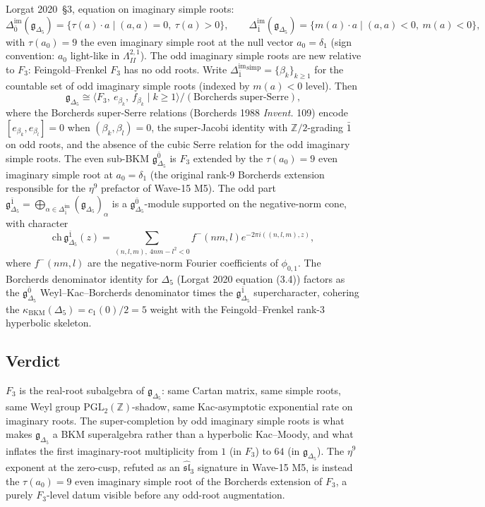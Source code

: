 \documentclass[12pt]{article}
\providecommand{\Z}{\mathbb{Z}}
\providecommand{\gDelta}{\mathfrak{g}_{\Delta_5}}
\providecommand{\FF}{F_3}
\providecommand{\slhat}[1]{\widehat{\mathfrak{sl}}_{#1}}
\providecommand{\LambII}{\Lambda^{2,1}_{II}}
\providecommand{\Dim}{\Delta^{\mathrm{im}}}
\providecommand{\kBKM}{\kappa_{\mathrm{BKM}}}
\providecommand{\PGL}{\mathrm{PGL}}
\begin{document}
Lorgat 2020~\S 3, equation on imaginary simple roots:
\[
  \Dim_{\bar 0}(\gDelta) = \{\tau(a)\cdot a \mid (a,a) = 0,\ \tau(a) > 0\},
  \qquad
  \Dim_{\bar 1}(\gDelta) = \{m(a)\cdot a \mid (a,a) < 0,\ m(a) < 0\},
\]
with $\tau(a_0) = 9$ the even imaginary simple root at the
null vector $a_0 = \delta_1$ (sign convention: $a_0$ light-like
in $\LambII$). The odd imaginary simple roots are new relative
to $\FF$: Feingold--Frenkel $\FF$ has no odd roots. Write
$\Dim_{\bar 1}^{\mathrm{simp}} = \{\beta_k\}_{k \geq 1}$ for the
countable set of odd imaginary simple roots (indexed by $m(a) < 0$
level). Then
\[
  \gDelta \cong \langle \FF,\ e_{\beta_k},\ f_{\beta_k} \mid k \geq 1\rangle
  / (\text{Borcherds super-Serre}),
\]
where the Borcherds super-Serre relations (Borcherds 1988
\emph{Invent.} 109) encode $[e_{\beta_k}, e_{\beta_l}] = 0$ when
$(\beta_k, \beta_l) = 0$, the super-Jacobi identity with
$\Z/2$-grading $\bar 1$ on odd roots, and the absence of the
cubic Serre relation for the odd imaginary simple roots. The
even sub-BKM $\gDelta^{\bar 0}$ is $\FF$ extended by the
$\tau(a_0) = 9$ even imaginary simple root at $a_0 = \delta_1$
(the original rank-$9$ Borcherds extension responsible for the
$\eta^9$ prefactor of Wave-15 M5). The odd part
$\gDelta^{\bar 1} = \bigoplus_{\alpha\in\Dim_{\bar 1}}(\gDelta)_\alpha$
is a $\gDelta^{\bar 0}$-module supported on the negative-norm
cone, with character
\[
  \mathrm{ch}\, \gDelta^{\bar 1}(z) = \sum_{(n,l,m),\ 4nm-l^2 < 0} f^{-}(nm,l) e^{-2\pi i((n,l,m),z)},
\]
where $f^-(nm,l)$ are the negative-norm Fourier coefficients of
$\phi_{0,1}$. The Borcherds denominator identity for $\Delta_5$
(Lorgat 2020 equation (3.4)) factors as the $\gDelta^{\bar 0}$
Weyl--Kac--Borcherds denominator times the $\gDelta^{\bar 1}$
supercharacter, cohering the $\kBKM(\Delta_5) = c_1(0)/2 = 5$
weight with the Feingold--Frenkel rank-$3$ hyperbolic skeleton.

\subsection*{Verdict}

$\FF$ is the real-root subalgebra of $\gDelta$: same Cartan
matrix, same simple roots, same Weyl group $\PGL_2(\Z)$-shadow,
same Kac-asymptotic exponential rate on imaginary roots. The
super-completion by odd imaginary simple roots is what makes
$\gDelta$ a BKM superalgebra rather than a hyperbolic
Kac--Moody, and what inflates the first imaginary-root
multiplicity from $1$ (in $\FF$) to $64$ (in $\gDelta$). The
$\eta^9$ exponent at the zero-cusp, refuted as an $\slhat{3}$
signature in Wave-15 M5, is instead the $\tau(a_0) = 9$ even
imaginary simple root of the Borcherds extension of $\FF$, a
purely $\FF$-level datum visible before any odd-root augmentation.
\end{document}
